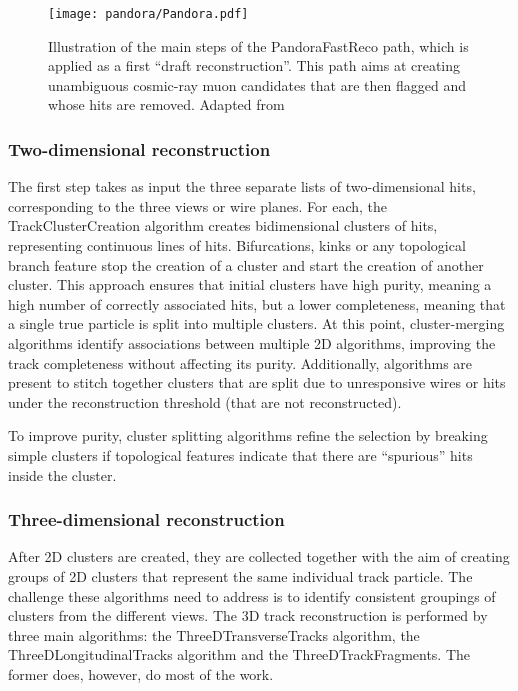 \begin{figure}
    \centering
    \texttt{[image: pandora/Pandora.pdf]}
    \caption[PandoraFastReco path illustration]{Illustration of the main steps of the PandoraFastReco path, which is applied as a first ``draft reconstruction''. This path aims at creating unambiguous cosmic-ray muon candidates that are then flagged and whose hits are removed. Adapted from \cite{MicroBooNE:2017xvs}}
    \label{fig:PandoraFastReco}
\end{figure}

\subsubsection{Two-dimensional reconstruction}

The first step takes as input the three separate lists of two-dimensional hits, corresponding to the three views or wire planes. For each, the TrackClusterCreation algorithm creates bidimensional clusters of hits, representing continuous lines of hits. Bifurcations, kinks or any topological branch feature stop the creation of a cluster and start the creation of another cluster. This approach ensures that initial clusters have high purity, meaning a high number of correctly associated hits, but a lower completeness, meaning that a single true particle is split into multiple clusters. At this point, cluster-merging algorithms identify associations between multiple 2D algorithms, improving the track completeness without affecting its purity. Additionally, algorithms are present to stitch together clusters that are split due to unresponsive wires or hits under the reconstruction threshold (that are not reconstructed). 

To improve purity, cluster splitting algorithms refine the selection by breaking simple clusters if topological features indicate that there are ``spurious'' hits inside the cluster. 

\subsubsection{Three-dimensional reconstruction}

After 2D clusters are created, they are collected together with the aim of creating groups of 2D clusters that represent the same individual track particle. The challenge these algorithms need to address is to identify consistent groupings of clusters from the different views. The 3D track reconstruction is performed by three main algorithms: the ThreeDTransverseTracks algorithm, the ThreeDLongitudinalTracks algorithm and the ThreeDTrackFragments. The former does, however, do most of the work. 

